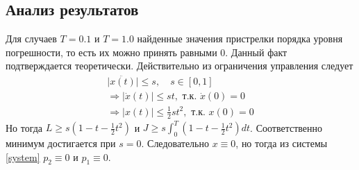 \documentclass[a4paper,12pt]{article}
\begin{document}
\subsection*{Анализ результатов}
Для случаев \(T=0.1\) и \(T=1.0\) найденные значения пристрелки порядка уровня погрешности, то есть их можно принять равными \(0\). Данный факт подтверждается теоретически. Действительно из ограничения управления следует
\begin{gather*}
  \vert \ddot{x(t)} \vert \le s, \quad s \in [0, 1] \\
  \Rightarrow \vert \dot{x}(t) \vert \le s t, \text{ т.к. } \dot{x}(0) = 0 \\
  \Rightarrow \vert x(t) \vert \le \frac{1}{2} s t^2, \text{ т.к. } x(0) = 0
\end{gather*}
Но тогда \(L \ge s \left(1 - t - \frac{1}{2} t^2\right)\) и \(J \ge s \int_{0}^{T} \left(1 - t - \frac{1}{2} t^2\right)dt\). Соответственно минимум достигается при \(s=0\). Следовательно \(x\equiv0\), но тогда из системы \cref{system} \(p_2\equiv0\) и \(p_1\equiv0\).
\end{document}
